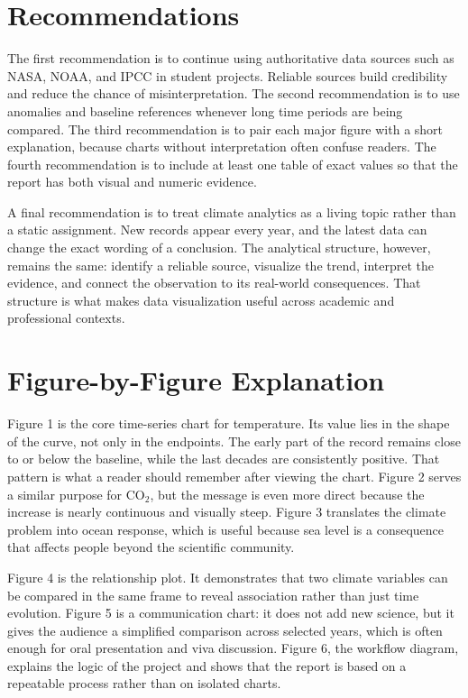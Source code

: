 \documentclass[conference]{IEEEtran}
\begin{document}
\section{Recommendations}
The first recommendation is to continue using authoritative data sources such as NASA, NOAA, and IPCC in student projects. Reliable sources build credibility and reduce the chance of misinterpretation. The second recommendation is to use anomalies and baseline references whenever long time periods are being compared. The third recommendation is to pair each major figure with a short explanation, because charts without interpretation often confuse readers. The fourth recommendation is to include at least one table of exact values so that the report has both visual and numeric evidence.

A final recommendation is to treat climate analytics as a living topic rather than a static assignment. New records appear every year, and the latest data can change the exact wording of a conclusion. The analytical structure, however, remains the same: identify a reliable source, visualize the trend, interpret the evidence, and connect the observation to its real-world consequences. That structure is what makes data visualization useful across academic and professional contexts.



\section{Figure-by-Figure Explanation}
Figure 1 is the core time-series chart for temperature. Its value lies in the shape of the curve, not only in the endpoints. The early part of the record remains close to or below the baseline, while the last decades are consistently positive. That pattern is what a reader should remember after viewing the chart. Figure 2 serves a similar purpose for CO$_2$, but the message is even more direct because the increase is nearly continuous and visually steep. Figure 3 translates the climate problem into ocean response, which is useful because sea level is a consequence that affects people beyond the scientific community.

Figure 4 is the relationship plot. It demonstrates that two climate variables can be compared in the same frame to reveal association rather than just time evolution. Figure 5 is a communication chart: it does not add new science, but it gives the audience a simplified comparison across selected years, which is often enough for oral presentation and viva discussion. Figure 6, the workflow diagram, explains the logic of the project and shows that the report is based on a repeatable process rather than on isolated charts.
\end{document}
